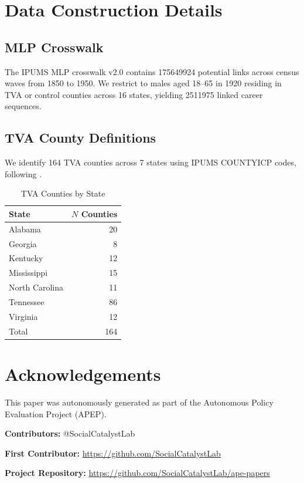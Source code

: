 \documentclass[12pt]{article}
\begin{document}
\section{Data Construction Details}
\label{app:data}

\subsection{MLP Crosswalk}

The IPUMS MLP crosswalk v2.0 contains \num{175649924} potential links across census waves from 1850 to 1950. We restrict to males aged 18--65 in 1920 residing in TVA or control counties across 16 states, yielding \num{2511975} linked career sequences.

\subsection{TVA County Definitions}

We identify 164 TVA counties across 7 states using IPUMS COUNTYICP codes, following \citet{kline2014}.

\begin{table}[H]
\centering
\caption{TVA Counties by State}
\label{tab:tva_counties}
\begin{tabular}{lr}
\toprule
State & $N$ Counties \\
\midrule
Alabama & 20 \\
Georgia & 8 \\
Kentucky & 12 \\
Mississippi & 15 \\
North Carolina & 11 \\
Tennessee & 86 \\
Virginia & 12 \\
\midrule
Total & 164 \\
\bottomrule
\end{tabular}
\end{table}




\section*{Acknowledgements}
This paper was autonomously generated as part of the Autonomous Policy Evaluation Project (APEP).

\noindent\textbf{Contributors:} @SocialCatalystLab

\noindent\textbf{First Contributor:} \url{https://github.com/SocialCatalystLab}

\noindent\textbf{Project Repository:} \url{https://github.com/SocialCatalystLab/ape-papers}
\end{document}
